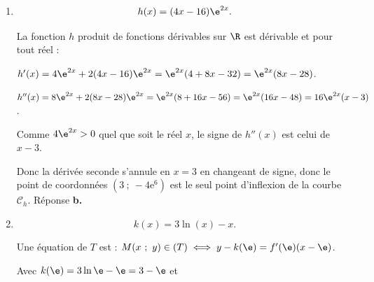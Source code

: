 \begin{enumerate}
$\displaystyle\lim_{x \to -\infty}x + 1= - \infty$ et 

$\displaystyle\lim_{x \to -\infty}\dfrac{1}{\e^x} = + \infty$, donc par produit de limites : $\displaystyle\lim_{x \to -\infty}g(x) = - \infty$. Réponse \textbf{a.}

\item %
\[h(x) = (4x - 16)\e^{2x}.\]



%
La fonction $h$ produit de fonctions dérivables sur $\R$ est dérivable et pour tout réel :

$h'(x) = 4\e^{2x} + 2(4x - 16)\e^{2x} = \e^{2x}(4 + 8x - 32) = \e^{2x}(8x - 28)$.

$h''(x) = 8\e^{2x} + 2(8x - 28)\e^{2x} = \e^{2x}(8 + 16x  - 56) = \e^{2x}(16x - 48) = 16\e^{2x}(x - 3)$.

Comme $4\e^{2x} > 0$ quel que soit le réel $x$, le signe de $h''(x)$ est celui de $x - 3$.

Donc la dérivée seconde s'annule en $x = 3$ en changeant de signe, donc le point de coordonnées $\left(3~;~-4\text{e}^{6}\right)$ est le seul point d'inflexion de la courbe $\mathcal{C}_h$. Réponse \textbf{b.}

\item %
\[k(x) = 3 \ln (x) - x.\]



Une équation de $T$ est : $M(x~;~y) \in (T) \iff y - k(\e) = f'(\e)(x- \e)$.

Avec $k(\e) = 3\ln \e - \e = 3 - \e$ et 


\end{enumerate}
